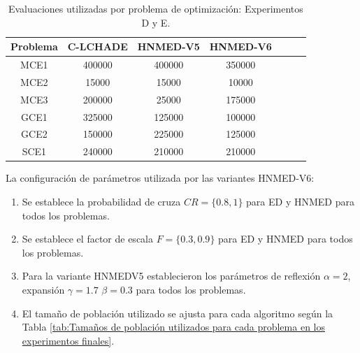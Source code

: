 \begin{table}[]
	
	\caption{Evaluaciones utilizadas por problema de optimización: Experimentos D y E.}
	\label{tab:Evaluaciones utilizadas por problema de optimización: Experimentos D y E.}
	\centering
	
	\begin{tabular}{ccccccc}
		\textbf{Problema} &   C-LCHADE     &HNMED-V5&HNMED-V6 \\
		\hline
		MCE1   &   400000 &400000 &350000   \\
		MCE2   &   15000  &15000  &10000   \\
		MCE3   &   200000 &25000  &175000  \\
		GCE1   &   325000 &125000  &100000\\
		GCE2   &   150000 &225000  &125000\\
		SCE1   &   240000 &210000  &210000\\
	\end{tabular}
	
\end{table}
La configuración de parámetros utilizada por las variantes HNMED-V6:
\begin{enumerate}
	\item Se establece la probabilidad de cruza $CR=\{0.8, 1\}$ para ED y HNMED para todos los problemas.
	\item Se establece el factor de escala $F=\{0.3, 0.9\}$ para ED y HNMED para todos los problemas.
	\item Para la variante HNMEDV5 establecieron los parámetros de reflexión $\alpha=2$, expansión $\gamma=1.7$ $\beta=0.3$ para todos los problemas.
	\item El tamaño de población utilizado se ajusta para cada algoritmo según la Tabla \ref{tab:Tamaños de población utilizados para cada problema en los experimentos finales}. 
\end{enumerate}


